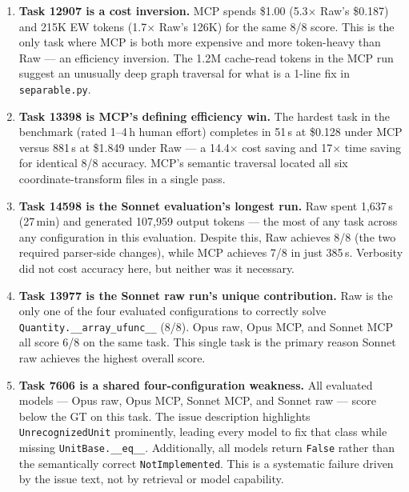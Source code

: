 \begin{enumerate}

\item \textbf{Task 12907 is a cost inversion.}
      MCP spends \$1.00 (5.3$\times$ Raw's \$0.187) and 215K EW tokens
      (1.7$\times$ Raw's 126K) for the same 8/8 score.
      This is the only task where MCP is both more expensive and more
      token-heavy than Raw --- an efficiency inversion.
      The 1.2M cache-read tokens in the MCP run suggest an unusually
      deep graph traversal for what is a 1-line fix in \texttt{separable.py}.

\item \textbf{Task 13398 is MCP's defining efficiency win.}
      The hardest task in the benchmark (rated 1--4\,h human effort)
      completes in 51\,s at \$0.128 under MCP versus 881\,s at \$1.849
      under Raw --- a 14.4$\times$ cost saving and 17$\times$ time saving
      for identical 8/8 accuracy.
      MCP's semantic traversal located all six coordinate-transform files
      in a single pass.

\item \textbf{Task 14598 is the Sonnet evaluation's longest run.}
      Raw spent 1{,}637\,s (27\,min) and generated 107{,}959 output tokens
      --- the most of any task across any configuration in this
      evaluation.  Despite this, Raw achieves 8/8 (the two required
      parser-side changes), while MCP achieves 7/8 in just 385\,s.
      Verbosity did not cost accuracy here, but neither was it
      necessary.

\item \textbf{Task 13977 is the Sonnet raw run's unique contribution.}
      Raw is the only one of the four evaluated configurations to
      correctly solve \texttt{Quantity.\_\_array\_ufunc\_\_} (8/8).
      Opus raw, Opus MCP, and Sonnet MCP all score 6/8 on the same task.
      This single task is the primary reason Sonnet raw achieves the
      highest overall score.

\item \textbf{Task 7606 is a shared four-configuration weakness.}
      All evaluated models --- Opus raw, Opus MCP, Sonnet MCP, and
      Sonnet raw --- score below the GT on this task.
      The issue description highlights \texttt{UnrecognizedUnit}
      prominently, leading every model to fix that class while missing
      \texttt{UnitBase.\_\_eq\_\_}.
      Additionally, all models return \texttt{False} rather than the
      semantically correct \texttt{NotImplemented}.
      This is a systematic failure driven by the issue text, not by
      retrieval or model capability.


\end{enumerate}
